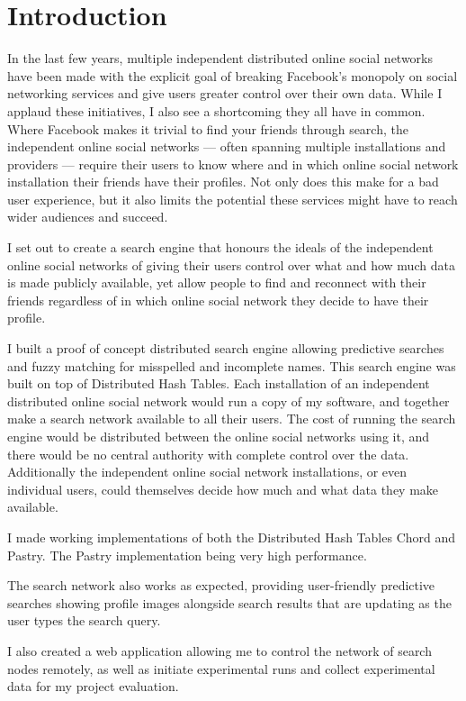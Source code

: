 


\section{Introduction}
In the last few years, multiple independent distributed online social networks have been made with the explicit goal of breaking Facebook's monopoly on social networking services and give users greater control over their own data.
While I applaud these initiatives, I also see a shortcoming they all have in common. Where Facebook makes it trivial to find your friends through search, the independent online social networks --- often spanning multiple installations and providers --- require their users to know where and in which online social network installation their friends have their profiles. Not only does this make for a bad user experience, but it also limits the potential these services might have to reach wider audiences and succeed.

I set out to create a search engine that honours the ideals of the independent online social networks of giving their users control over what and how much data is made publicly available, yet allow people to find and reconnect with their friends regardless of in which online social network they decide to have their profile.

I built a proof of concept distributed search engine allowing predictive searches and fuzzy matching for misspelled and incomplete names. This search engine was built on top of Distributed Hash Tables. Each installation of an independent distributed online social network would run a copy of my software, and together make a search network available to all their users. The cost of running the search engine would be distributed between the online social networks using it, and there would be no central authority with complete control over the data. Additionally the independent online social network installations, or even individual users, could themselves decide how much and what data they make available.

I made working implementations of both the Distributed Hash Tables Chord and Pastry. The Pastry implementation being very high performance.

The search network also works as expected, providing user-friendly predictive searches showing profile images alongside search results that are updating as the user types the search query.

I also created a web application allowing me to control the network of search nodes remotely, as well as initiate experimental runs and collect experimental data for my project evaluation.
